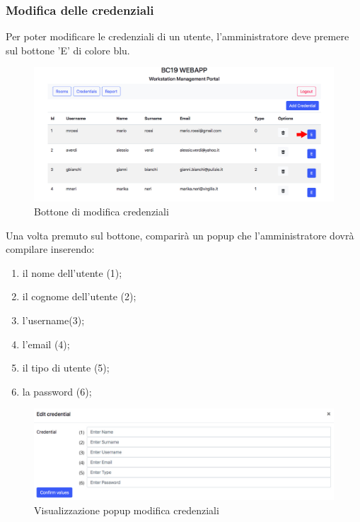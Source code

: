 \subsubsection{Modifica delle credenziali}
Per poter modificare le credenziali di un utente, l'amministratore deve premere sul bottone 'E' di colore blu.
\begin{figure}[H]
	\centering
	\includegraphics[width=15cm]{res/images/optionEdit.jpg}
	\caption{Bottone di modifica credenziali}
\end{figure}
Una volta premuto sul bottone, comparirà un popup che l'amministratore dovrà compilare inserendo:
\begin{enumerate}
	\item il nome dell'utente (1);
	\item il cognome dell'utente (2);
	\item l'username(3);
	\item l'email (4);
	\item il tipo di utente (5);
	\item la password (6);
\end{enumerate}
\begin{figure}[H]
	\centering
	\includegraphics[width=15cm]{res/images/editc.jpg}
	\caption{Visualizzazione popup modifica credenziali}
\end{figure}
